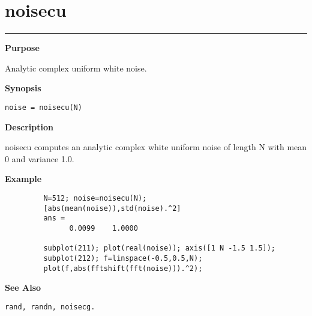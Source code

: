 


\section*{\hspace*{-1.6cm} noisecu}

\vspace*{-.4cm}
\hspace*{-1.6cm}\rule[0in]{16.5cm}{.02cm}
\vspace*{.2cm}



{\bf \large \sf Purpose}\\
\hspace*{1.5cm}
\begin{minipage}[t]{13.5cm}
Analytic complex uniform white noise.
\end{minipage}
\vspace*{.5cm}


{\bf \large \sf Synopsis}\\
\hspace*{1.5cm}
\begin{minipage}[t]{13.5cm}
\begin{verbatim}
noise = noisecu(N)
\end{verbatim}
\end{minipage}
\vspace*{.5cm}


{\bf \large \sf Description}\\
\hspace*{1.5cm}
\begin{minipage}[t]{13.5cm}
        {\ty noisecu} computes an analytic complex white uniform
         noise of length {\ty N} with mean 0 and variance 1.0.\\ 
 
\end{minipage}
\vspace*{.5cm}


{\bf \large \sf Example}
\begin{verbatim}
         N=512; noise=noisecu(N);
         [abs(mean(noise)),std(noise).^2]
         ans = 
               0.0099    1.0000

         subplot(211); plot(real(noise)); axis([1 N -1.5 1.5]);
         subplot(212); f=linspace(-0.5,0.5,N); 
         plot(f,abs(fftshift(fft(noise))).^2);
\end{verbatim}
\vspace*{.5cm}


{\bf \large \sf See Also}\\
\hspace*{1.5cm}
\begin{minipage}[t]{13.5cm}
\begin{verbatim}
rand, randn, noisecg.
\end{verbatim}
\end{minipage}
